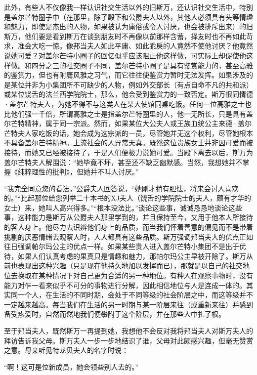 \par 此外，有些人不仅像我一样认识社交生活以外的旧斯万，还认识社交生活中，特别是盖尔芒特圈子中（在那里，除了殿下和公爵夫人以外，其他人必须具有头等情趣和魅力，即使是杰出的人物，如果被认为庸俗或令人讨厌，也会被排斥出来）的旧斯万，他们要是看到斯万在谈到朋友时不再像以前那样含蓄，择友时也不再如此苛求，准会大吃一惊。像邦当夫人如此平庸、如此乖戾的人竟然不使他讨厌？他竟然说她可爱？对盖尔芒特小圈子的回忆似乎应该阻止他这样做，可实际上却促使他这样做。和四分之三的社交圈子不同，盖尔芒特小圈子是具有鉴赏能力的，甚至高雅的鉴赏力，但也有附庸风雅之习气，而它往往使鉴赏力暂时无法发挥。如果涉及的是某位并非为小集团所不可缺少的人物，例如外交部长（有点自命不凡的共和派）或某位饶舌的法兰西学院院士，那么，他会受到鉴赏力的一致否定。斯万很同情德·盖尔芒特夫人，为她不得不与这类人在某大使馆同桌吃饭。任何一位高雅之士也比他们强一千倍，所谓高雅之士是指盖尔芒特圈里的人，他一无所长，只是具有盖尔芒特精神，属于同一宗派。然而，如果某位大公夫人或王族血统公主来德·盖尔芒特夫人家吃饭的话，她会成为这宗派的一员，尽管她并无这个权利，尽管她根本不具备盖尔芒特精神。上流社会的人异常天真。既然这位贵族女士并非因可爱而被接待，而她又已经被接待了，于是人们便极力说她可爱。当殿下离去以后，斯万为盖尔芒特夫人解围说：“她毕竟不坏，甚至还不缺乏幽默感。当然，我想她并不掌握《纯粹理性的批判》，但她并不叫人讨厌。”
\par “我完全同意您的看法，”公爵夫人回答说，“她刚才稍有胆怯，将来会讨人喜欢的。”“比起那位给您列举二十本书的XJ夫人（饶舌的学院院士的夫人，颇有才华的女士）来，她叫人高兴得多。”“根本没法比。”谈论这些事，诚诚恳恳地谈论这些事，这种能力是斯万从公爵夫人那里学到的，并且保持至今，又用于他本人所接待的客人身上。他尽力去识辨他们身上的品质，而当我们怀着善意的偏见而不是带着挑剔的厌恶情绪去观察人时，人人都具有这些品质。斯万强调邦当夫人的优点正如往日强调帕尔玛公主的优点一样。如果某些贵人进入盖尔芒特小集团不是出于优待，如果人们认真考虑的果真只是情趣和魅力，那帕尔玛公主早被开除了。斯万从前也表现出这种兴趣（只是现在他持久地加以发挥而已），那就是以自己的社交地位去换取在某种情况下对自己更为合适的另一种地位。有种人在观察事物时，没有能力对乍一看来似乎不可分的事物进行分解，因此相信地位与人是连成一体的。其实同一个人，在生活的不同时期，会处于不同等级的社会阶层之中，而这等级并不一定越来越高。每当我们在生活的另一时期与某一阶层来往（或重新来往）并感到备受疼爱时，自然而然地我们便攀附于这个阶层，并在那些人中扎了根。
\par 至于邦当夫人，既然斯万一再提到她，我想他不会反对我将邦当夫人对斯万夫人的拜访告诉我父母。斯万夫人一步一步地结识了谁，父母对此颇感兴趣，但毫无赞赏之意。母亲听见特龙贝夫人的名字时说：
\par “啊！这可是位新成员，她会领些别人去的。”
